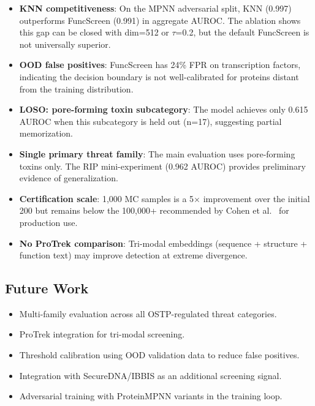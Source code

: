 \documentclass[11pt,a4paper]{article}
\begin{document}
\begin{itemize}[leftmargin=*]
    \item \textbf{KNN competitiveness}: On the MPNN adversarial split, KNN (0.997) outperforms FuncScreen (0.991) in aggregate AUROC. The ablation shows this gap can be closed with dim=512 or $\tau$=0.2, but the default FuncScreen is not universally superior.
    \item \textbf{OOD false positives}: FuncScreen has 24\% FPR on transcription factors, indicating the decision boundary is not well-calibrated for proteins distant from the training distribution.
    \item \textbf{LOSO: pore-forming toxin subcategory}: The model achieves only 0.615 AUROC when this subcategory is held out (n=17), suggesting partial memorization.
    \item \textbf{Single primary threat family}: The main evaluation uses pore-forming toxins only. The RIP mini-experiment (0.962 AUROC) provides preliminary evidence of generalization.
    \item \textbf{Certification scale}: 1,000 MC samples is a 5$\times$ improvement over the initial 200 but remains below the 100,000+ recommended by Cohen et al.\ \cite{cohen2019certified} for production use.
    \item \textbf{No ProTrek comparison}: Tri-modal embeddings (sequence + structure + function text) may improve detection at extreme divergence.
\end{itemize}

\subsection{Future Work}

\begin{itemize}[leftmargin=*]
    \item Multi-family evaluation across all OSTP-regulated threat categories.
    \item ProTrek integration for tri-modal screening.
    \item Threshold calibration using OOD validation data to reduce false positives.
    \item Integration with SecureDNA/IBBIS as an additional screening signal.
    \item Adversarial training with ProteinMPNN variants in the training loop.
\end{itemize}

\end{document}
